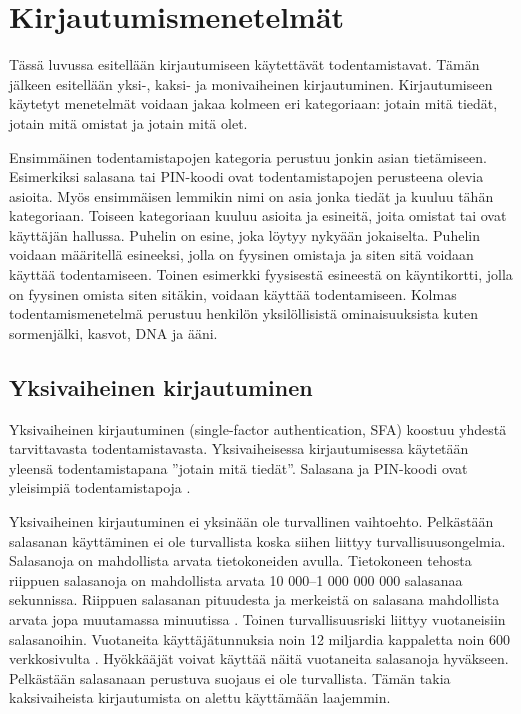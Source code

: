 \chapter{Kirjautumismenetelmät\label{kirjautumismenetelmät}}

Tässä luvussa esitellään kirjautumiseen käytettävät todentamistavat. Tämän jälkeen esitellään yksi-, kaksi- ja monivaiheinen kirjautuminen.
Kirjautumiseen käytetyt menetelmät voidaan jakaa kolmeen eri kategoriaan: jotain mitä tiedät, jotain mitä omistat ja jotain mitä olet.

Ensimmäinen todentamistapojen kategoria perustuu jonkin asian tietämiseen. Esimerkiksi salasana tai PIN-koodi ovat todentamistapojen perusteena olevia asioita. Myös ensimmäisen lemmikin nimi on asia jonka tiedät ja kuuluu tähän kategoriaan. Toiseen kategoriaan kuuluu asioita ja esineitä, joita omistat tai ovat käyttäjän hallussa. Puhelin on esine, joka löytyy nykyään jokaiselta. Puhelin voidaan määritellä esineeksi, jolla on fyysinen omistaja ja siten sitä voidaan käyttää todentamiseen. Toinen esimerkki fyysisestä esineestä on käyntikortti, jolla on fyysinen omista siten sitäkin, voidaan käyttää todentamiseen. Kolmas todentamismenetelmä perustuu henkilön yksilöllisistä ominaisuuksista kuten sormenjälki, kasvot, DNA ja ääni.

\section{Yksivaiheinen kirjautuminen}

Yksivaiheinen kirjautuminen (single-factor authentication, SFA) koostuu yhdestä tarvittavasta todentamistavasta. Yksivaiheisessa kirjautumisessa käytetään yleensä todentamistapana ”jotain mitä tiedät”. Salasana ja PIN-koodi ovat yleisimpiä todentamistapoja \citep{NIST_800_63B}.

Yksivaiheinen kirjautuminen ei yksinään ole turvallinen vaihtoehto. Pelkästään salasanan käyttäminen ei ole turvallista koska siihen liittyy turvallisuusongelmia. Salasanoja on mahdollista arvata tietokoneiden avulla. Tietokoneen tehosta riippuen salasanoja on mahdollista arvata 10 000–1 000 000 000 salasanaa sekunnissa. Riippuen salasanan pituudesta ja merkeistä on salasana mahdollista arvata jopa muutamassa minuutissa \citep{brute_force_attack}. Toinen turvallisuusriski liittyy vuotaneisiin salasanoihin. Vuotaneita käyttäjätunnuksia noin 12 miljardia kappaletta noin 600 verkkosivulta \citep{Have_i_been_pwned}. Hyökkääjät voivat käyttää näitä vuotaneita salasanoja hyväkseen. Pelkästään salasanaan perustuva suojaus ei ole turvallista. Tämän takia kaksivaiheista kirjautumista on alettu käyttämään laajemmin. 

